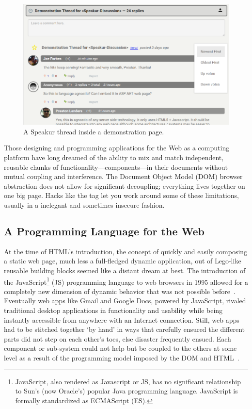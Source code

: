 \begin{figure}[htb]
\centering
 \includegraphics[width=\textwidth]{images/screenshot_20150312_1630_v2.png}
\caption{A Speakur thread inside a demonstration page.}
\label{f:demo1}
\end{figure}

Those designing and programming applications for the Web as a computing platform have long dreamed of the ability to mix and match independent, reusable chunks of functionality---components---in their documents without mutual coupling and interference. 
The Document Object Model (DOM)
browser abstraction does not allow for significant decoupling; 
everything lives together on one big page. Hacks like the 
tag let you work around some of these limitations, usually in a inelegant and sometimes insecure fashion.

\subsection{A Programming Language for the Web}
At the time of HTML's introduction, the concept of quickly and easily composing a static web page, 
much less a full-fledged dynamic application, 
out of Lego-like reusable building blocks seemed like a distant dream at best. 
The introduction of the 
JavaScript\footnote{JavaScript, also rendered as Javascript or JS, 
has no significant relationship to Sun's (now Oracle's) popular Java programming language. JavaScript is formally standardized as ECMAScript (ES).}
(JS) programming language to web browsers in 1995 allowed for a completely new dimension of dynamic behavior that was not possible before~\cite{w3ccontributors2012}.
Eventually web apps like Gmail and Google Docs, powered by JavaScript, rivaled traditional desktop applications in functionality and usability while being instantly accessible from anywhere with an Internet connection.
Still, web apps had to be stitched together `by hand' in ways that carefully ensured the different parts did not step on each other's toes, else disaster frequently ensued. 
Each component or sub-system could not help but be coupled to the others at some level as a result of the programming model imposed by the DOM and HTML~\cite{ihrig2012}.

